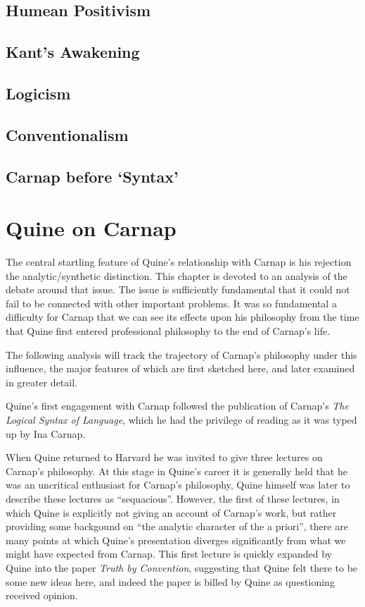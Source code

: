 \section{Humean Positivism}

\section{Kant's Awakening}

\section{Logicism}

\section{Conventionalism}

\section{Carnap before `Syntax'}

\chapter{Quine on Carnap}

\nocite{carnap56,carnap63,copi67,quine53,quine61, quine61a,quine66,quine86}

The central startling feature of Quine's relationship with
Carnap is his rejection the analytic/synthetic distinction.
This chapter is devoted to an analysis of the debate around
that issue.
The issue is sufficiently fundamental that it could not fail
to be connected with other important problems.
It was so fundamental a difficulty for Carnap that we can
see its effects upon his philosophy from the time that Quine
first entered professional philosophy to the end of Carnap's
life.

The following analysis will track the trajectory of Carnap's
philosophy under this influence, the major features of which
are first sketched here, and later examined in greater detail.

Quine's first engagement with Carnap followed the publication
of Carnap's {\it The Logical Syntax of Language}\cite{carnap37},
which he had the privilege of reading as it was typed up by
Ina Carnap.

When Quine returned to Harvard he was invited to give three
lectures on Carnap's philosophy.  
At this stage in Quine's career it is generally held that
he was an uncritical enthusiast for Carnap's philosophy,
Quine himself was later to describe these lectures as ``sequacious''.
However, the first of these lectures, in which Quine is explicitly
not giving an account of Carnap's work, but rather providing some
backgound on ``the analytic character of the a priori'', there
are many points at which Quine's presentation diverges significantly
from what we might have expected from Carnap.
This first lecture is quickly expanded by Quine into the paper
{\it Truth by Convention}\cite{quine36}, suggesting that Quine
felt there to be some new ideas here, and indeed the paper is
billed by Quine as questioning received opinion.

